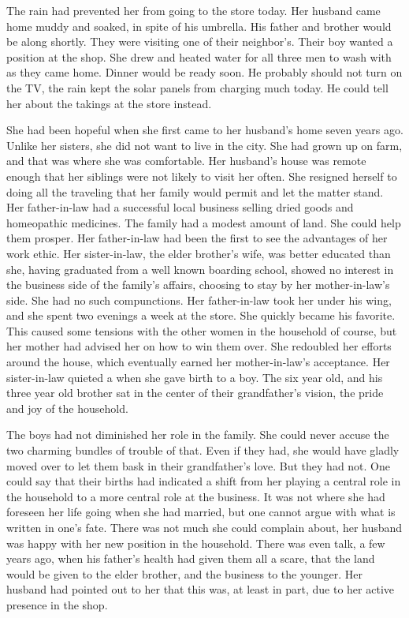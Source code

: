 \documentclass{article}
\begin{document}
The rain had prevented her from going to the store today. Her husband came home muddy and soaked, in spite of his umbrella. His father and brother would be along shortly. They were visiting one of their neighbor's. Their boy wanted a position at the shop. She drew and heated water for all three men to wash with as they came home. Dinner would be ready soon. He probably should not turn on the TV, the rain kept the solar panels from charging much today. He could tell her about the takings at the store instead.

She had been hopeful when she first came to her husband's home seven years ago. Unlike her sisters, she did not want to live in the city. She had grown up on farm, and that was where she was comfortable. Her husband's house was remote enough that her siblings were not likely to visit her often. She resigned herself to doing all the traveling that her family would permit and let the matter stand. Her father-in-law had a successful local business selling dried goods and homeopathic medicines. The family had a modest amount of land. She could help them prosper. Her father-in-law had been the first to see the advantages of her work ethic. Her sister-in-law, the elder brother's wife, was better educated than she, having graduated from a well known boarding school, showed no interest in the business side of the family's affairs, choosing to stay by her mother-in-law's side. She had no such compunctions. Her father-in-law took her under his wing, and she spent two evenings a week at the store. She quickly became his favorite. This caused some tensions with the other women in the household of course, but her mother had advised her on how to win them over. She redoubled her efforts around the house, which eventually earned her mother-in-law's acceptance. Her sister-in-law quieted a when she gave birth to a boy. The six year old, and his three year old brother sat in the center of their grandfather's vision, the pride and joy of the household.

The boys had not diminished her role in the family. She could never accuse the two charming bundles of trouble of that. Even if they had, she would have  gladly moved over to let them bask in their grandfather's love. But they had not. One could say that their births had indicated a shift from her playing a central role in the household to a more central role at the business. It was not where she had foreseen her life going when she had married, but one cannot argue with what is written in one's fate. There was not much she could complain about, her husband was happy with her new position in the household. There was even talk, a few years ago, when his father's health had given them all a scare, that the land would be given to the elder brother, and the business to the younger. Her husband had pointed out to her that this was, at least in part, due to her active presence in the shop. 
\end{document}
